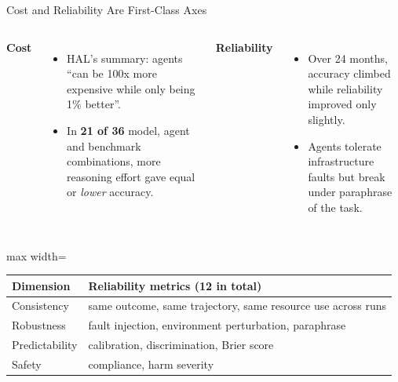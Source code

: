\begin{frame}{Cost and Reliability Are First-Class Axes}
    \begin{columns}[T,onlytextwidth]
        \textbf{Cost}
        \begin{itemize}\itemsep0.4em
            \item HAL's summary: agents ``can be 100x more expensive while only being 1\% better''.
            \item In \textbf{21 of 36} model, agent and benchmark combinations, more reasoning effort gave equal or \emph{lower} accuracy.
        \end{itemize}
        \textbf{Reliability}
        \begin{itemize}\itemsep0.4em
            \item Over 24 months, accuracy climbed while reliability improved only slightly.
            \item Agents tolerate infrastructure faults but \alert{break under paraphrase} of the task.
        \end{itemize}
    \end{columns}
    \vspace{0.5em}
    \begin{center}
    \small
    \begin{adjustbox}{max width=\linewidth}\begin{tabular}{>{\raggedright\arraybackslash}p{2.6cm}>{\raggedright\arraybackslash}p{10.2cm}}
        \toprule
        \textbf{Dimension} & \textbf{Reliability metrics (12 in total)} \\
        \midrule
        Consistency & same outcome, same trajectory, same resource use across runs \\
        Robustness & fault injection, environment perturbation, paraphrase \\
        Predictability & calibration, discrimination, Brier score \\
        Safety & compliance, harm severity \\
        \bottomrule
    \end{tabular}\end{adjustbox}
    \end{center}
\end{frame}

